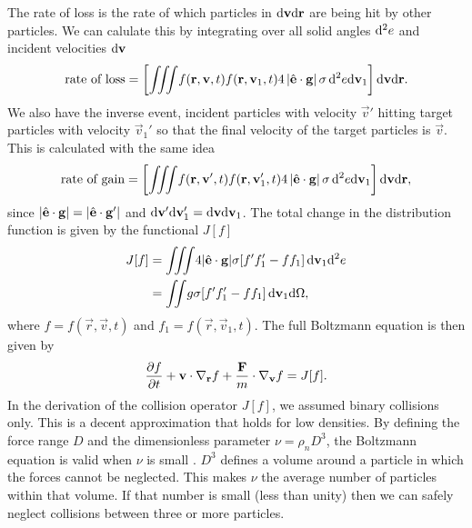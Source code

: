 The rate of loss is the rate of which particles in $\mathrm{d}\mathbf v\mathrm{d}\mathbf r$ are being hit by other particles. We can calulate this by integrating over all solid angles $\mathrm{d}^2 e$ and incident velocities $\mathrm{d}\mathbf v$
\begin{align}
	\text{rate of loss} = \left[\iiint\! f(\mathbf r, \mathbf v, t)f(\mathbf r, \mathbf v_1, t)4\left|\hat {\mathbf{e}} \cdot \mathbf g \right|\sigma \,\mathrm{d}^2 e\mathrm{d}\mathbf v_1\right]\mathrm{d}\mathbf v\mathrm{d}\mathbf r.
\end{align}
We also have the inverse event, incident particles with velocity $\vec v'$ hitting target particles with velocity $\vec v_1'$ so that the final velocity of the target particles is $\vec v$. This is calculated with the same idea
\begin{align}
	\text{rate of gain} = \left[\iiint\! f(\mathbf r, \mathbf v', t)f(\mathbf r, \mathbf v_1', t)4\left|\hat {\mathbf{e}} \cdot \mathbf g \right|\sigma \,\mathrm{d}^2 e\mathrm{d}\mathbf v_1\right]\mathrm{d}\mathbf v\mathrm{d}\mathbf r,
\end{align}
since $|\hat {\mathbf{e}}\cdot \mathbf g| = |\hat {\mathbf{e}}\cdot \mathbf g'|$ and $\mathrm{d}\mathbf v'\mathrm{d}\mathbf v_1' = \mathrm{d}\mathbf v\mathrm{d}\mathbf v_1$. The total change in the distribution function is given by the functional $J[f]$
\begin{align}
	J[f] &= \iiint\! 4|\hat {\mathbf{e}}\cdot\mathbf g|\sigma[f'f_1' - ff_1]\,\mathrm{d}\mathbf v_1 \mathrm{d}^2e\\
	&= \iint\! g \sigma[f'f_1' - ff_1] \,\mathrm{d}\mathbf v_1 \mathrm{d}\Omega,
\end{align}
where $f = f(\vec r, \vec v, t)$ and $f_1 = f(\vec r, \vec v_1, t)$. The full Boltzmann equation is then given by
\begin{align}
	\label{eq:boltzmann_equation}
	\frac{\partial f}{\partial t} + \mathbf v\cdot \nabla_\mathbf r f + \frac{\mathbf F}{m}\cdot\nabla_\mathbf v f = J[f].
\end{align}
In the derivation of the collision operator $J[f]$, we assumed binary collisions only. This is a decent approximation that holds for low densities. By defining the force range $D$ and the dimensionless parameter $\nu = \rho_n D^3$, the Boltzmann equation is valid when $\nu$ is small \cite{mclennan1989introduction}. $D^3$ defines a volume around a particle in which the forces cannot be neglected. This makes $\nu$ the average number of particles within that volume. If that number is small (less than unity) then we can safely neglect collisions between three or more particles.
